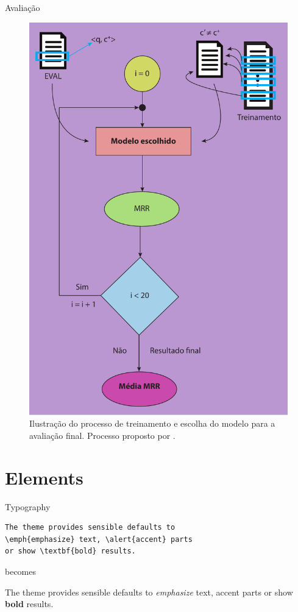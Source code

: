 \documentclass[10pt]{beamer}
\begin{document}
\begin{frame}{Avaliação}
	\begin{figure}[h]
        \centering
        \includegraphics[height=0.80\textheight]{figuras/final_evaluation_process.pdf}
        \caption{Ilustração do processo de treinamento e escolha do modelo para a avaliação final. Processo proposto por \cite{iyer-etal-2016-summarizing}.}
        \label{fig:test1}
    \end{figure}
\end{frame}


\section{Elements}

\begin{frame}[fragile]{Typography}
      \begin{verbatim}The theme provides sensible defaults to
\emph{emphasize} text, \alert{accent} parts
or show \textbf{bold} results.\end{verbatim}

  \begin{center}becomes\end{center}

  The theme provides sensible defaults to \emph{emphasize} text,
  \alert{accent} parts or show \textbf{bold} results.
\end{frame}
\end{document}
